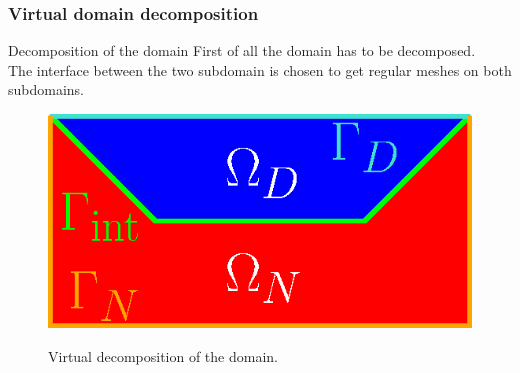 \documentclass[aspectratio=169]{ISAE-Beamer}
\begin{document}
\subsubsection{Virtual domain decomposition}

\begin{frame}{Decomposition of the domain}
First of all the domain has to be decomposed. \\

The interface between the two subdomain is chosen to get regular meshes on both subdomains.
\begin{figure}[t]%
\centering
\includegraphics[width=0.5\columnwidth]{part_3/applications/mixed_bd_waves/dom_split.eps} \\
\caption{Virtual decomposition of the domain.}
\end{figure}
\end{frame}
\end{document}
